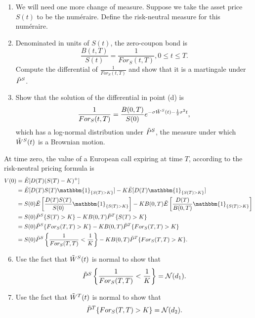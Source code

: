 \documentclass[11pt,a4,table]{article}
\begin{document}
\begin{enumerate}
\begin{enumerate}
        \item We will need one more change of measure. Suppose we take the asset price $S(t)$ to be the numéraire. Define the risk-neutral measure for this numéraire.
        
        \item Denominated in units of $S(t)$, the zero-coupon bond is
        \begin{equation*}
            \frac{B(t,T)}{S(t)}=\frac{1}{For_S(t,T)}, 0\leq t \leq T.
        \end{equation*}
        Compute the differential of $\frac{1}{For_S(t,T)}$ and show that it is a martingale under $\Tilde{P}^S$.
        
        \item Show that the solution of the differential in point (d) is
        \begin{equation}
            \frac{1}{For_S(t,T)} = \frac{B(0,T)}{S(0)}e^{-\sigma\Tilde{W}^S(t)-\frac{1}{2}\sigma^2t},
        \end{equation}
        which has a log-normal distribution under $\Tilde{P}^S$, the measure under which $\Tilde{W}^S(t)$ is a Brownian motion.
    \end{enumerate}
    
    At time zero, the value of a European call expiring at time $T$, according to the risk-neutral pricing formula is
    \begin{align}
        V(0) &= \Tilde{E}[D(T)(S(T)-K)^+] \nonumber \\
        &= \Tilde{E}[D(T)S(T)\mathbbm{1}_{\{S(T)>K\}}] - K\Tilde{E}[D(T)\mathbbm{1}_{\{S(T)>K\}}] \nonumber \\
        &= S(0)\Tilde{E}\left[\frac{D(T)S(T)}{S(0)}\mathbbm{1}_{\{S(T)>K\}}\right] - KB(0,T)\Tilde{E}\left[\frac{D(T)}{B(0,T)}\mathbbm{1}_{\{S(T)>K\}}\right] \nonumber \\
        &= S(0)\Tilde{P}^S\{S(T)>K\} - KB(0,T)\Tilde{P}^T\{S(T)>K\} \nonumber \\
        &= S(0)\Tilde{P}^S\{For_S(T,T)>K\} - KB(0,T)\Tilde{P}^T\{For_S(T,T)>K\} \nonumber \\
        &= S(0)\Tilde{P}^S\left\{\frac{1}{For_S(T,T)}<\frac{1}{K}\right\} - KB(0,T)\Tilde{P}^T\{For_S(T,T)>K\}.
    \end{align}
    \begin{enumerate}
        \setcounter{enumii}{5}
        
        \item Use the fact that $\Tilde{W}^S(t)$ is normal to show that
        \begin{equation*}
            \Tilde{P}^S\left\{\frac{1}{For_S(T,T)} < \frac{1}{K}\right\} = \mathcal{N}(d_1).
        \end{equation*}
        
        \item Use the fact that $\Tilde{W}^T(t)$ is normal to show that
        \begin{equation*}
            \Tilde{P}^T\{For_S(T,T)>K\} = \mathcal{N}(d_2).
        \end{equation*}
    \end{enumerate}
    
\end{enumerate}
\end{document}
